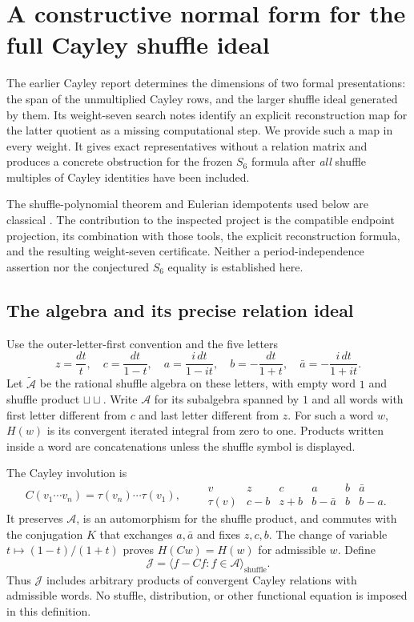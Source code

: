 \section{A constructive normal form for the full Cayley shuffle ideal}
\label{cay:sec:projection}

The earlier Cayley report determines the dimensions of two formal
presentations: the span of the unmultiplied Cayley rows, and the larger
shuffle ideal generated by them.  Its weight-seven search notes identify
an explicit reconstruction map for the latter quotient as a missing
computational step.  We provide such a map in every weight.  It gives
exact representatives without a relation matrix and produces a concrete
obstruction for the frozen $S_6$ formula after \emph{all} shuffle multiples
of Cayley identities have been included.

The shuffle-polynomial theorem and Eulerian idempotents used below are
classical \cite{cay:Radford,cay:Patras}.  The contribution to the inspected
project is the compatible endpoint projection, its combination with
those tools, the explicit reconstruction formula, and the resulting
weight-seven certificate.  Neither a period-independence assertion nor
the conjectured $S_6$ equality is established here.

\subsection{The algebra and its precise relation ideal}

Use the outer-letter-first convention and the five letters
\[
 z=\frac{dt}{t},\quad c=\frac{dt}{1-t},\quad
 a=\frac{i\,dt}{1-it},\quad b=-\frac{dt}{1+t},\quad
 \bar a=-\frac{i\,dt}{1+it}.
\]
Let $\widetilde{\mathcal A}$ be the rational shuffle algebra on these
letters, with empty word $1$ and shuffle product $\mathbin{\sqcup\!\sqcup}$.
Write $\mathcal A$ for its subalgebra spanned by $1$ and all words with
first letter different from $c$ and last letter different from $z$.
For such a word $w$, $H(w)$ is its convergent iterated integral from
zero to one.  Products written inside a word are concatenations unless
the shuffle symbol is displayed.

The Cayley involution is
\[
 C(v_1\cdots v_n)=\tau(v_n)\cdots\tau(v_1),\qquad
 \begin{array}{c|ccccc}
 v&z&c&a&b&\bar a\\ \hline
 \tau(v)&c-b&z+b&b-\bar a&b&b-a .
 \end{array}
\]
It preserves $\mathcal A$, is an automorphism for the shuffle product,
and commutes with the conjugation $K$ that exchanges $a,\bar a$ and
fixes $z,c,b$.  The change of variable $t\mapsto(1-t)/(1+t)$ proves
$H(Cw)=H(w)$ for admissible $w$.  Define
\begin{equation}\label{cay:eq:ideal}
 \mathcal J=\langle f-Cf:f\in\mathcal A\rangle_{\mathrm{shuffle}}.
\end{equation}
Thus $\mathcal J$ includes arbitrary products of convergent Cayley
relations with admissible words.  No stuffle, distribution, or other
functional equation is imposed in this definition.

